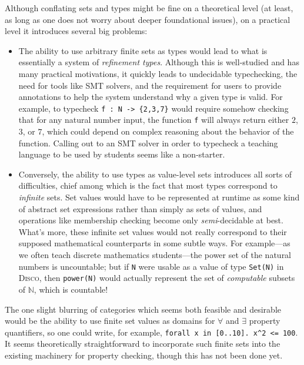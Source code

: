 \documentclass[copyright,creativecommons,11pt]{eptcs}
\newcommand{\disco}{\textsc{Disco}\xspace}
\newcommand{\N}{\mathbb{N}}
\begin{document}
Although conflating sets and types might be fine on a theoretical
level (at least, as long as one does not worry about deeper
foundational issues), on a practical level it introduces several
big problems:

\begin{itemize}
\item The ability to use arbitrary finite sets as types would lead to
  what is essentially a system of \emph{refinement types}.  Although
  this is well-studied and has many practical motivations, it quickly
  leads to undecidable typechecking, the need for tools like SMT
  solvers, and the requirement for users to provide annotations to
  help the system understand why a given type is valid.  For example,
  to typecheck %
  \verb|f : N -> {2,3,7}| would require somehow checking that for any
  natural number input, the function \verb|f| will always return
  either $2$, $3$, or $7$, which could depend on complex reasoning
  about the behavior of the function.  Calling out to an SMT solver in
  order to typecheck a teaching language to be used by students seems
  like a non-starter.
\item Conversely, the ability to use types as value-level sets
  introduces all sorts of difficulties, chief among which is the fact
  that most types correspond to \emph{infinite} sets.  Set values
  would have to be represented at runtime as some kind of abstract set
  expressions rather than simply as sets of values, and operations
  like membership checking become only \emph{semi}-decidable at best.
  What's more, these infinite set values would not really correspond
  to their supposed mathematical counterparts in some subtle ways.
  For example---as we often teach discrete mathematics students---the
  power set of the natural numbers is uncountable; but if \texttt{N}
  were usable as a value of type \texttt{Set(N)} in \disco, then
  \texttt{power(N)} would actually represent the set of
  \emph{computable} subsets of $\N$, which is countable!
\end{itemize}

The one slight blurring of categories which seems both feasible and
desirable would be the ability to use finite set values as domains for
$\forall$ and $\exists$ property quantifiers, so one could write, for
example, \texttt{forall x in [0..10]. x^2 <= 100}.  It seems
theoretically straightforward to incorporate such finite sets into the
existing machinery for property checking, though this has not been
done yet.
\end{document}
